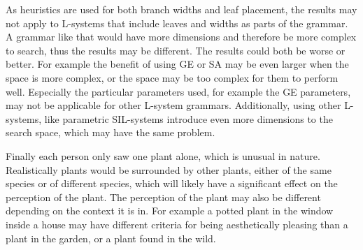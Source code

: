 As heuristics are used for both branch widths and leaf placement, the results may not apply to \glspl{L-system} that include leaves and widths as parts of the grammar.
A grammar like that would have more dimensions and therefore be more complex to search, thus the results may be different.
The results could both be worse or better.
For example the benefit of using \gls{GE} or \gls{SA} may be even larger when the space is more complex, or the space may be too complex for them to perform well.
Especially the particular parameters used, for example the \gls{GE} parameters, may not be applicable for other \gls{L-system} grammars.
Additionally, using other \glspl{L-system}, like parametric SIL-systems introduce even more dimensions to the search space, which may have the same problem.

Finally each person only saw one plant alone, which is unusual in nature.
Realistically plants would be surrounded by other plants, either of the same species or of different species, which will likely have a significant effect on the perception of the plant.
The perception of the plant may also be different depending on the context it is in.
For example a potted plant in the window inside a house may have different criteria for being aesthetically pleasing than a plant in the garden, or a plant found in the wild.


